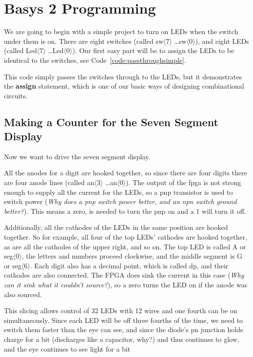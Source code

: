 \chapter{Basys 2 Programming}

We are going to begin with a simple project to turn on LEDs when the switch under them is on.  There are eight switches (called sw$\langle 7\rangle$ \ldots sw$\langle 0\rangle$), and eight LEDs  (called Led$\langle 7\rangle$ \ldots Led$\langle 0\rangle$).  Our first easy part will be to assign the LEDs to be identical to the switches, see Code~\ref{code:passthroughsimple}.


This code simply passes the switches through to the LEDs, but it demonstrates the \textbf{assign} statement, which is one of our basic ways of designing combinational circuits.

\section{Making a Counter for the Seven Segment Display}

Now we want to drive the seven segment display.

All the anodes for a digit are hooked together, so since there are four digits there are four anode lines (called an$\langle 3\rangle$ \ldots an$\langle 0\rangle$).  The output of the fpga is not strong enough to supply all the current for the LEDs, so a pnp transistor is used to switch power (\emph{Why does a pnp switch power better, and an npn switch ground better?}).  This means a zero, is needed to turn the pnp on and a 1 will turn it off.

Additionally, all the cathodes of the LEDs in the same position are hooked together.  So for example, all four of the top LEDs' cathodes are hooked together, as are all the cathodes of the upper right, and so on.  The top LED is called A or seg$\langle 0\rangle$, the letters and numbers proceed clockwise, and the middle segment is G or seg$\langle 6\rangle$.  Each digit also has a decimal point, which is called dp, and their cathodes are also connected.   The FPGA does sink the current in this case (\emph{Why can it sink what it couldn't source?}), so a zero turns the LED on if the anode was also sourced.

This slicing allows control of 32 LEDs with 12 wires and one fourth can be on simultaneously.  Since each LED will be off three fourths of the time, we need to switch them faster than the eye can see, and since the diode's pn junction holds charge for a bit (discharges like a capacitor, why?) and thus continues to glow, and the eye continues to see light for a bit